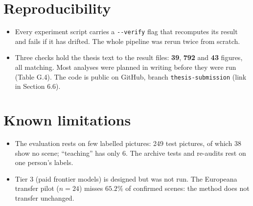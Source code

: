 \documentclass[10pt,a4paper]{article}
\newcommand{\num}[1]{\textbf{#1}}
\begin{document}
\section{Reproducibility}
\begin{itemize}
  \item Every experiment script carries a \texttt{-{}-verify} flag that recomputes its result and fails if it has drifted. The whole pipeline was rerun twice from scratch.
  \item Three checks hold the thesis text to the result files: \num{39}, \num{792} and \num{43} figures, all matching. Most analyses were planned in writing before they were run (Table G.4). The code is public on GitHub, branch \texttt{thesis-submission} (link in Section 6.6).
\end{itemize}

\section{Known limitations}
\begin{itemize}
  \item The evaluation rests on few labelled pictures: 249 test pictures, of which 38 show no scene; ``teaching'' has only 6. The archive tests and re-audits rest on one person's labels.
  \item Tier 3 (paid frontier models) is designed but was not run. The Europeana transfer pilot ($n=24$) misses $65.2\%$ of confirmed scenes: the method does not transfer unchanged.
\end{itemize}
\end{document}
